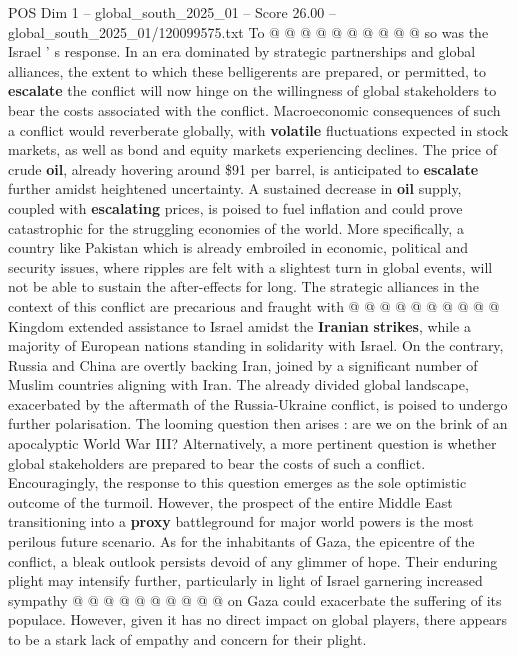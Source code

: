 \begin{textsample}{POS Dim 1 – global\_south\_2025\_01 – Score 26.00 – global\_south\_2025\_01/120099575.txt}
To @ @ @ @ @ @ @ @ @ @ so was the Israel ' s response.
In an era dominated by strategic partnerships and global alliances, the extent to which these belligerents are prepared, or permitted, to \textbf{escalate} the conflict will now hinge on the willingness of global stakeholders to bear the costs associated with the conflict.
Macroeconomic consequences of such a conflict would reverberate globally, with \textbf{volatile} fluctuations expected in stock markets, as well as bond and equity markets experiencing declines.
The price of crude \textbf{oil}, already hovering around \$91 per barrel, is anticipated to \textbf{escalate} further amidst heightened uncertainty.
A sustained decrease in \textbf{oil} supply, coupled with \textbf{escalating} prices, is poised to fuel inflation and could prove catastrophic for the struggling economies of the world.
More specifically, a country like Pakistan which is already embroiled in economic, political and security issues, where ripples are felt with a slightest turn in global events, will not be able to sustain the after-effects for long.
The strategic alliances in the context of this conflict are precarious and fraught with @ @ @ @ @ @ @ @ @ @ Kingdom extended assistance to Israel amidst the \textbf{Iranian} \textbf{strikes}, while a majority of European nations standing in solidarity with Israel.
On the contrary, Russia and China are overtly backing Iran, joined by a significant number of Muslim countries aligning with Iran.
The already divided global landscape, exacerbated by the aftermath of the Russia-Ukraine conflict, is poised to undergo further polarisation.
The looming question then arises : are we on the brink of an apocalyptic World War III?
Alternatively, a more pertinent question is whether global stakeholders are prepared to bear the costs of such a conflict.
Encouragingly, the response to this question emerges as the sole optimistic outcome of the turmoil.
However, the prospect of the entire Middle East transitioning into a \textbf{proxy} battleground for major world powers is the most perilous future scenario.
As for the inhabitants of Gaza, the epicentre of the conflict, a bleak outlook persists devoid of any glimmer of hope.
Their enduring plight may intensify further, particularly in light of Israel garnering increased sympathy @ @ @ @ @ @ @ @ @ @ on Gaza could exacerbate the suffering of its populace.
However, given it has no direct impact on global players, there appears to be a stark lack of empathy and concern for their plight.

\end{textsample}
